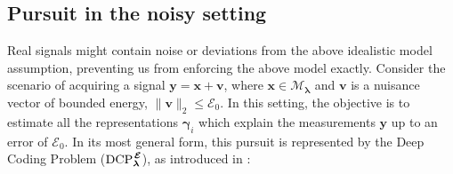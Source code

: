\documentclass[10pt,journal]{IEEEtran}
\def\x{{\mathbf x}}
\def\v{{\mathbf v}}
\def\y{{\mathbf y}}
\def\D{{\mathbf D}}
\def\gama{{\boldsymbol \gamma}}
\def\lamda{{\boldsymbol \lambda}}
\def\vps{{\bm{\mathbf{\mathcal{E}}}}}
\def\DCPE{{\text{DCP}_\lamda^{\hspace{0.04cm} \vps}}}
\theoremstyle{plain}
\theoremstyle{definition}
\begin{document}



\subsection{Pursuit in the noisy setting}

Real signals might contain noise or deviations from the above idealistic model assumption, preventing us from enforcing the above model exactly. Consider the scenario of acquiring a signal $\y = \x + \v$, where $\x \in \mathcal{M}_\lamda$ and $\v$ is a nuisance vector of bounded energy, $\|\v\|_2 \leq \mathcal{E}_0$. In this setting, the objective is to estimate all the representations $\gama_i$ which explain the measurements $\y$ up to an error of $\mathcal{E}_0$. %
In its most general form, this pursuit is represented by the Deep Coding Problem ($\DCPE$), as introduced in \cite{Papyan2016convolutional}:
\end{document}
